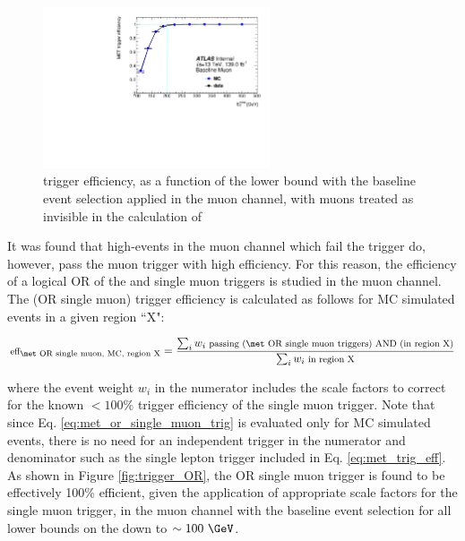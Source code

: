 \begin{figure}[htbp]
    \centering
     \includegraphics[width = 0.6\textwidth]{Figures/5/efficiency_baseline_muInvis.pdf}
     \caption{\met trigger efficiency, as a function of the \met lower bound with the baseline event selection applied in the muon channel, with muons treated as invisible in the calculation of \met}
     \label{fig:metmuinvis}
  \end{figure}
 
It was found that high-\met events in the muon channel which fail the \met trigger do, however, pass the muon trigger with high efficiency. For this reason, the efficiency of a logical OR of the \met and single muon triggers is studied in the muon channel. The (\met OR single muon) trigger efficiency is calculated as follows for MC simulated events in a given region ``X":

\begin{equation}
\label{eq:met_or_single_muon_trig}
\begin{footnotesize}
\text{eff}_\text{\met OR single muon, MC, region X} = \frac{\sum_i w_i\text{ passing ($\met$ OR single muon triggers)\text{ AND }(in region X)}}{\sum_i w_i\text{ in region X}}
\end{footnotesize}
\end{equation}

\noindent where the event weight \(w_i\) in the numerator includes the scale factors to correct for the known \(<100\%\) trigger efficiency of the single muon trigger. Note that since Eq. \ref{eq:met_or_single_muon_trig} is evaluated only for MC simulated events, there is no need for an independent trigger in the numerator and denominator such as the single lepton trigger included in Eq. \ref{eq:met_trig_eff}. As shown in Figure \ref{fig:trigger_OR}, the \met OR single muon trigger is found to be effectively 100\% efficient, given the application of appropriate scale factors for the single muon trigger, in the muon channel with the baseline event selection for all lower bounds on the \met down to  \(\sim 100~\GeV\).


